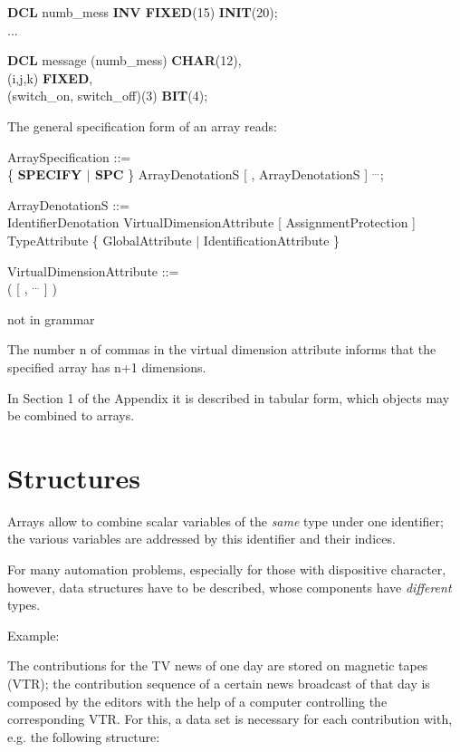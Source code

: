 {\bf DCL} numb\_mess {\bf INV FIXED}(15) {\bf INIT}(20);\\
\x ...

{\bf DCL}  message (numb\_mess) {\bf CHAR}(12),\\
\x (i,j,k) {\bf FIXED},\\
\x (switch\_on, switch\_off)(3) {\bf BIT}(4);

The general specification form of an array reads:

\begin{front}
ArraySpecification ::=\\
\x \{ {\bf SPECIFY $\mid$ SPC} \} ArrayDenotationS [ , ArrayDenotationS ] $^{...}$;

ArrayDenotationS ::=\\
\x IdentifierDenotation VirtualDimensionAttribute [ AssignmentProtection ] \\
\x TypeAttribute \{ GlobalAttribute $\mid$ IdentificationAttribute \}

VirtualDimensionAttribute ::=\\
\x ( [ , $^{...}$ ] )
\end{front}
\begin{grammar}
not in grammar
\end{grammar}

The number n of commas in the virtual dimension attribute informs that
the specified array has n+1 dimensions.

In Section 1 of the Appendix it is described in tabular form, which
objects may be combined to arrays.


\section{Structures}   %

Arrays allow to combine scalar variables of the {\it same} type under
one identifier; the various variables are addressed by this identifier
and their indices.

For many automation problems, especially for those with dispositive
character, however, data structures have to be described, whose
components have {\it different} types.

Example:

The contributions for the TV news of one day are stored on magnetic
tapes (VTR); the contribution sequence of a certain news broadcast of
that day is composed by the editors with the help of a computer
controlling the corresponding VTR. For this, a data set is necessary for
each contribution with, e.g. the following structure:

